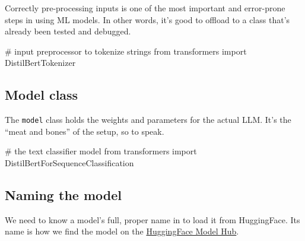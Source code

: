 \documentclass[
  letterpaper,
  DIV=11,
  numbers=noendperiod]{scrartcl}
\newenvironment{Shaded}{\begin{snugshade}}{\end{snugshade}}
\newcommand{\CommentTok}[1]{\textcolor[rgb]{0.37,0.37,0.37}{#1}}
\newcommand{\ImportTok}[1]{\textcolor[rgb]{0.00,0.46,0.62}{#1}}
\newcommand{\NormalTok}[1]{\textcolor[rgb]{0.00,0.23,0.31}{#1}}
\begin{document}
\begin{tcolorbox}[enhanced jigsaw, leftrule=.75mm, colbacktitle=quarto-callout-note-color!10!white, title=\textcolor{quarto-callout-note-color}{\faInfo}\hspace{0.5em}{Note}, left=2mm, opacitybacktitle=0.6, toprule=.15mm, coltitle=black, opacityback=0, arc=.35mm, colframe=quarto-callout-note-color-frame, breakable, bottomtitle=1mm, bottomrule=.15mm, colback=white, rightrule=.15mm, titlerule=0mm, toptitle=1mm]

Correctly pre-processing inputs is one of the most important and
error-prone steps in using ML models. In other words, it's good to
offload to a class that's already been tested and debugged.

\end{tcolorbox}

\begin{Shaded}
\begin{Highlighting}[]
\CommentTok{\# input preprocessor to tokenize strings}
\ImportTok{from}\NormalTok{ transformers }\ImportTok{import}\NormalTok{ DistilBertTokenizer}
\end{Highlighting}
\end{Shaded}

\subsection{Model class}\label{model-class}

The \texttt{model} class holds the weights and parameters for the actual
LLM. It's the ``meat and bones'' of the setup, so to speak.

\begin{Shaded}
\begin{Highlighting}[]
\CommentTok{\# the text classifier model}
\ImportTok{from}\NormalTok{ transformers }\ImportTok{import}\NormalTok{ DistilBertForSequenceClassification}
\end{Highlighting}
\end{Shaded}

\subsection{Naming the model}\label{naming-the-model}

We need to know a model's full, proper name in to load it from
HuggingFace. Its name is how we find the model on the
\href{https://huggingface.co/docs/hub/models-the-hub}{HuggingFace Model
Hub}.
\end{document}
